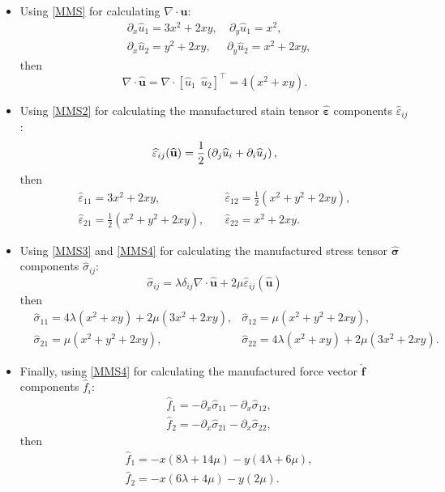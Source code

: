 \documentclass{report}
\newcommand{\bu}{\textbf{u}}
\newcommand{\wu}{\widehat{u}}
\newcommand{\wbu}{\widehat{\textbf{u}}}
\newcommand{\we}{\widehat{\varepsilon}}
\newcommand{\ws}{\widehat{\sigma}}
\newcommand{\wf}{\widehat{f}}
\newcommand{\bff}{\textbf{f}}
\newcommand{\sig}{\boldsymbol{\sigma}}
\newcommand{\eps}{\boldsymbol{\varepsilon}}
\def\bu{{\bf{u}}}
\begin{document}
\begin{itemize}
\item Using \eqref{MMS} for calculating $\nabla\cdot\wbu$:
%
\begin{equation}\label{MMS2}
\begin{aligned}
&\partial_x\wu_1=3x^2+2xy, &~\partial_y\wu_1=x^2,\\
&\partial_x\wu_2=y^2+2xy,  &\partial_y\wu_2=x^2+2xy,
\end{aligned}
\end{equation}
then
\begin{equation}\label{MMS3}
\nabla\cdot\widehat{\mathbf{u}}=\nabla\cdot[\wu_1~~\wu_2]^\top=4(x^2+xy).
\end{equation}
\item Using \eqref{MMS2} for  calculating the manufactured stain tensor $\widehat{\eps}$ components $\widehat{\varepsilon}_{ij}$:
	\begin{equation*}
	\widehat{\varepsilon}_{ij}(\widehat{\bu})=\frac{1}{2}\left( \partial_j \widehat{u}_i+ \partial_i \widehat{u}_j\right),
	\end{equation*}
then
\begin{equation}\label{MMS4}
\begin{aligned}
\we_{11}=3x^2+2xy,\quad\quad\quad\quad &\we_{12}=\frac{1}{2}(x^2+y^2+2xy),\\
\we_{21}=\frac{1}{2}(x^2+y^2+2xy),\quad   &\we_{22}=x^2+2xy.
\end{aligned}
\end{equation}
\item Using \eqref{MMS3} and \eqref{MMS4} for calculating the manufactured stress tensor $\widehat{\sig}$ components $\ws_{ij}$:
\begin{equation*}
\ws_{ij}=\lambda\delta_{ij}\nabla\cdot\wbu+2\mu\we_{ij}(\wbu)
\end{equation*}
then
\begin{equation}
\begin{aligned}
&\ws_{11}=4\lambda(x^2+xy)+2\mu(3x^2+2xy),&\ws_{12}=\mu(x^2+y^2+2xy),\\
&\ws_{21}=\mu(x^2+y^2+2xy),&\ws_{22}=4\lambda(x^2+xy)+2\mu(3x^2+2xy).
\end{aligned}
\end{equation}
\item Finally,  using \eqref{MMS4} for calculating the manufactured force vector $\widehat{\bff}$ components $\widehat{f}_i$:
\begin{equation*}
\begin{aligned}
&\wf_{1}=-\partial_x\ws_{11}-\partial_x\ws_{12},\\
&\wf_{2}=-\partial_x\ws_{21}-\partial_x\ws_{22},
\end{aligned}
\end{equation*}
then
\begin{equation}\label{MMS-force}
\begin{aligned}
&\wf_{1}=-x(8\lambda+14\mu)-y(4\lambda+6\mu),\\
&\wf_{2}=-x(6\lambda+4\mu)-y(2\mu).
\end{aligned}
\end{equation}


\end{itemize}
\end{document}
